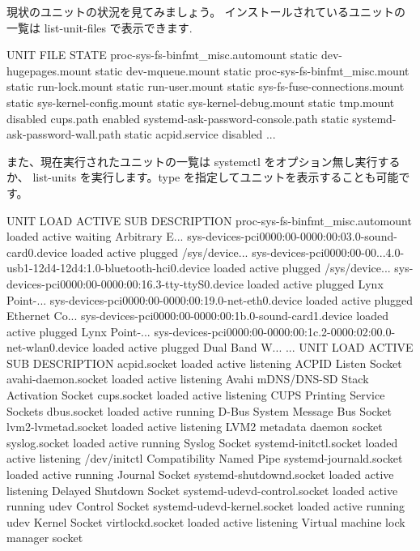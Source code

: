 \documentclass[mingoth,a4paper]{jsarticle}
\begin{document}
\noindent
現状のユニットの状況を見てみましょう。
インストールされているユニットの一覧は list-unit-files で表示できます.
\begin{commandline}
UNIT FILE                                   STATE
proc-sys-fs-binfmt_misc.automount           static
dev-hugepages.mount                         static
dev-mqueue.mount                            static
proc-sys-fs-binfmt_misc.mount               static
run-lock.mount                              static
run-user.mount                              static
sys-fs-fuse-connections.mount               static
sys-kernel-config.mount                     static
sys-kernel-debug.mount                      static
tmp.mount                                   disabled
cups.path                                   enabled
systemd-ask-password-console.path           static
systemd-ask-password-wall.path              static
acpid.service                               disabled
...
\end{commandline}
\noindent
また、現在実行されたユニットの一覧は systemctl をオプション無し実行するか、
list-units を実行します。type を指定してユニットを表示することも可能です。
\begin{commandline}
UNIT                                                                         LOAD   ACTIVE SUB       DESCRIPTION
proc-sys-fs-binfmt_misc.automount                                            loaded active waiting   Arbitrary E...
sys-devices-pci0000:00-0000:00:03.0-sound-card0.device                       loaded active plugged   /sys/device...
sys-devices-pci0000:00-00...4.0-usb1-1\x2d4-1\x2d4:1.0-bluetooth-hci0.device loaded active plugged   /sys/device...
sys-devices-pci0000:00-0000:00:16.3-tty-ttyS0.device                         loaded active plugged   Lynx Point-...
sys-devices-pci0000:00-0000:00:19.0-net-eth0.device                          loaded active plugged   Ethernet Co...
sys-devices-pci0000:00-0000:00:1b.0-sound-card1.device                       loaded active plugged   Lynx Point-...
sys-devices-pci0000:00-0000:00:1c.2-0000:02:00.0-net-wlan0.device            loaded active plugged   Dual Band W...
...
UNIT                         LOAD   ACTIVE SUB       DESCRIPTION
acpid.socket                 loaded active listening ACPID Listen Socket
avahi-daemon.socket          loaded active listening Avahi mDNS/DNS-SD Stack Activation Socket
cups.socket                  loaded active listening CUPS Printing Service Sockets
dbus.socket                  loaded active running   D-Bus System Message Bus Socket
lvm2-lvmetad.socket          loaded active listening LVM2 metadata daemon socket
syslog.socket                loaded active running   Syslog Socket
systemd-initctl.socket       loaded active listening /dev/initctl Compatibility Named Pipe
systemd-journald.socket      loaded active running   Journal Socket
systemd-shutdownd.socket     loaded active listening Delayed Shutdown Socket
systemd-udevd-control.socket loaded active running   udev Control Socket
systemd-udevd-kernel.socket  loaded active running   udev Kernel Socket
virtlockd.socket             loaded active listening Virtual machine lock manager socket
\end{commandline}
\end{document}
